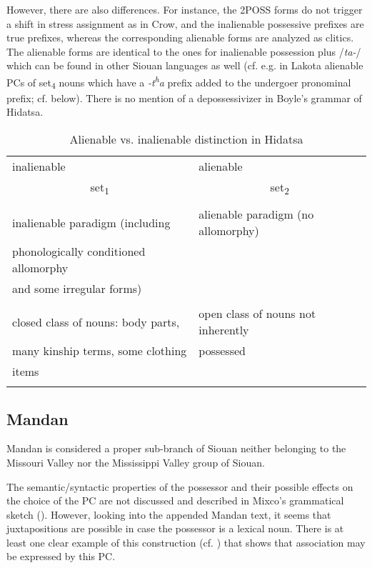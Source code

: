 \documentclass[output=paper]{LSP/langsci}
\begin{document}
However, there are also differences. For instance, the 2POSS forms do not trigger a shift in stress assignment as in Crow, and the inalienable possessive prefixes are true prefixes, whereas the corresponding alienable forms are analyzed as clitics.  The alienable forms are identical to the ones for inalienable possession plus /\textit{ta-}/ which can be found in other Siouan languages as well (cf. e.g. in Lakota alienable PCs of set\textsubscript{4} nouns which have a \textit{-t\textsuperscript{h}a} prefix added to the undergoer pronominal prefix; cf.  below). There is no mention of a depossessivizer in Boyle's grammar of Hidatsa.

\begin{table}
\caption{Alienable vs. inalienable distinction in Hidatsa} \label{hidatsaalienability}
\begin{tabular}{ l l }
\lsptoprule
inalienable & alienable \\
 \multicolumn{1}{c}{set\textsubscript{1}} &  \multicolumn{1}{c}{set\textsubscript{2}} \\
\midrule
&\\
inalienable paradigm (including & alienable paradigm (no allomorphy) \\
phonologically conditioned allomorphy & \\
and some irregular forms) & \\
 & \\
 closed class of nouns: body parts, & open class of nouns not inherently \\
many kinship terms, some clothing &  possessed \\
items & \\
\lspbottomrule
\end{tabular}
\end{table}

\subsection{Mandan}\label{sec:helmbrecht:4.3}
Mandan is considered a proper sub-branch of Siouan neither belonging to the Missouri Valley nor the Mississippi Valley group of Siouan. 

The semantic/syntactic properties of the possessor and their possible effects on the choice of the PC are not discussed and described in Mixco's grammatical sketch (\citealt{Mixco1997}). However, looking into the appended Mandan text, it seems that juxtapositions are possible in case  the possessor is a lexical noun. There is at least one clear example of this construction (cf. ) that shows that association may be expressed by this PC.
\end{document}
